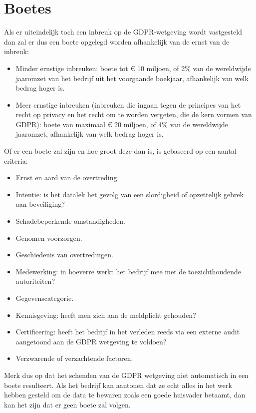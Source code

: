 \documentclass[
  10pt,
  dutch,
  paper=a4,
  ,captions=tableheading
]{scrbook}
\providecommand{\tightlist}{%
  \setlength{\itemsep}{0pt}\setlength{\parskip}{0pt}}
\begin{document}
\section{Boetes}\label{boetes}

Als er uiteindelijk toch een inbreuk op de GDPR-wetgeving wordt
vastgesteld dan zal er dus een boete opgelegd worden afhankelijk van de
ernst van de inbreuk:

\begin{itemize}
\tightlist
\item
  Minder ernstige inbreuken: boete tot € 10 miljoen, of 2\% van de
  wereldwijde jaaromzet van het bedrijf uit het voorgaande boekjaar,
  afhankelijk van welk bedrag hoger is.
\item
  Meer ernstige inbreuken (inbreuken die ingaan tegen de principes van
  het recht op privacy en het recht om te worden vergeten, die de kern
  vormen van GDPR): boete van maximaal € 20 miljoen, of 4\% van de
  wereldwijde jaaromzet, afhankelijk van welk bedrag hoger is.
\end{itemize}

Of er een boete zal zijn en hoe groot deze dan is, is gebaseerd op een
aantal criteria:

\begin{itemize}
\tightlist
\item
  Ernst en aard van de overtreding.
\item
  Intentie: is het datalek het gevolg van een slordigheid of opzettelijk
  gebrek aan beveiliging?
\item
  Schadebeperkende omstandigheden.
\item
  Genomen voorzorgen.
\item
  Geschiedenis van overtredingen.
\item
  Medewerking: in hoeverre werkt het bedrijf mee met de toezichthoudende
  autoriteiten?
\item
  Gegevenscategorie.
\item
  Kennisgeving: heeft men zich aan de meldplicht gehouden?
\item
  Certificering: heeft het bedrijf in het verleden reeds via een externe
  audit aangetoond aan de GDPR wetgeving te voldoen?
\item
  Verzwarende of verzachtende factoren.
\end{itemize}

\begin{tipblock}
Merk dus op dat het schenden van de GDPR wetgeving niet automatisch in
een boete resulteert. Als het bedrijf kan aantonen dat ze echt alles in
het werk hebben gesteld om de data te bewaren zoals een goede huisvader
betaamt, dan kan het zijn dat er geen boete zal volgen.
\end{tipblock}
\end{document}
